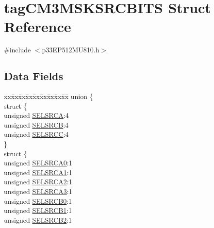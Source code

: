 \hypertarget{structtag_c_m3_m_s_k_s_r_c_b_i_t_s}{}\section{tag\+C\+M3\+M\+S\+K\+S\+R\+C\+B\+I\+TS Struct Reference}
\label{structtag_c_m3_m_s_k_s_r_c_b_i_t_s}


{\ttfamily \#include $<$p33\+E\+P512\+M\+U810.\+h$>$}

\subsection*{Data Fields}
\begin{DoxyCompactItemize}
\item 
\begin{tabbing}
xx\=xx\=xx\=xx\=xx\=xx\=xx\=xx\=xx\=\kill
union \{\\
\>struct \{\\
\>\>unsigned \hyperlink{structtag_c_m3_m_s_k_s_r_c_b_i_t_s_a71efbbcc07c5589abbdc8fbc64bb43b7}{SELSRCA}:4\\
\>\>unsigned \hyperlink{structtag_c_m3_m_s_k_s_r_c_b_i_t_s_a732414962412dfa9aa0a35c8acdf7441}{SELSRCB}:4\\
\>\>unsigned \hyperlink{structtag_c_m3_m_s_k_s_r_c_b_i_t_s_adb722d9a00c9d716af69dbadf03f066b}{SELSRCC}:4\\
\>\} \\
\>struct \{\\
\>\>unsigned \hyperlink{structtag_c_m3_m_s_k_s_r_c_b_i_t_s_a4f44ef494908be7240123901bbcd0235}{SELSRCA0}:1\\
\>\>unsigned \hyperlink{structtag_c_m3_m_s_k_s_r_c_b_i_t_s_aa42e5e64574e7f78278952e37052babd}{SELSRCA1}:1\\
\>\>unsigned \hyperlink{structtag_c_m3_m_s_k_s_r_c_b_i_t_s_a8e046d28e2f14c607d33a0126ad11f85}{SELSRCA2}:1\\
\>\>unsigned \hyperlink{structtag_c_m3_m_s_k_s_r_c_b_i_t_s_aa6a1c05a91e9d2a1114d06b8effb0eaf}{SELSRCA3}:1\\
\>\>unsigned \hyperlink{structtag_c_m3_m_s_k_s_r_c_b_i_t_s_a5c1da19a6275a00280765b4def3ea9a9}{SELSRCB0}:1\\
\>\>unsigned \hyperlink{structtag_c_m3_m_s_k_s_r_c_b_i_t_s_a99130b1cce6df5fb6cc53450953c64f5}{SELSRCB1}:1\\
\>\>unsigned \hyperlink{structtag_c_m3_m_s_k_s_r_c_b_i_t_s_a8b560e65c1713248c6b69d161849b4b4}{SELSRCB2}:1\\

\end{tabbing}
\end{DoxyCompactItemize}
